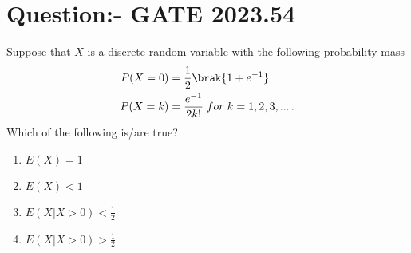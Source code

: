 \documentclass[journal,12pt,onecolumn]{IEEEtran}
\theoremstyle{remark}
\begin{document}
\section{Question:- GATE 2023.54}
Suppose that $X$ is a discrete random variable with the following probability mass
\begin{align}
	P(X=0)&=\frac{1}{2}\brak{1+e^{-1}}\\
	P(X=k)&=\frac{e^{-1}}{2k!} \; for \; k=1,2,3,... \, .
\end{align}
Which of the following is/are true?
\begin{enumerate}
	\item $E(X)=1$
	\item $E(X)<1$
	\item $E(X|X>0)<\frac{1}{2}$
	\item $E(X|X>0)>\frac{1}{2}$
\end{enumerate}
\solution
\end{document}
